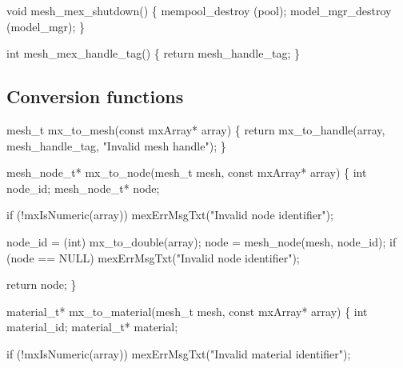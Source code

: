 \nwenddocs{}\plusendmoddef
void mesh_mex_shutdown()
\{
    mempool_destroy   (pool);
    model_mgr_destroy (model_mgr);
\}

\nwendcode{}\nwdocspar

\nwenddocs{}\plusendmoddef
int mesh_mex_handle_tag()
\{
    return mesh_handle_tag;
\}

\nwendcode{}\nwdocspar

\subsection{Conversion functions}

\nwenddocs{}\plusendmoddef
mesh_t mx_to_mesh(const mxArray* array)
\{
    return mx_to_handle(array, mesh_handle_tag, "Invalid mesh handle");
\}

\nwendcode{}\nwdocspar

\nwenddocs{}\plusendmoddef
mesh_node_t* mx_to_node(mesh_t mesh, const mxArray* array)
\{
    int node_id;
    mesh_node_t* node;

    if (!mxIsNumeric(array))
        mexErrMsgTxt("Invalid node identifier");

    node_id = (int) mx_to_double(array);
    node = mesh_node(mesh, node_id);
    if (node == NULL)
        mexErrMsgTxt("Invalid node identifier");

    return node;
\}

\nwendcode{}\nwdocspar

\nwenddocs{}\plusendmoddef
material_t* mx_to_material(mesh_t mesh, const mxArray* array)
\{
    int material_id;
    material_t* material;

    if (!mxIsNumeric(array))
        mexErrMsgTxt("Invalid material identifier");

